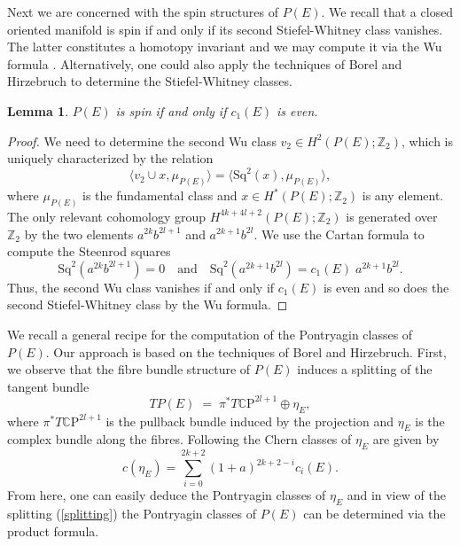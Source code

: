 \documentclass[10pt,a4paper]{amsart}
\theoremstyle{thm}
\newtheorem{lem}[thm]{Lemma}
\theoremstyle{text}
\begin{document}
Next we are concerned with the spin structures of $P(E)$. We recall that a closed oriented manifold is spin if and only if its second Stiefel-Whitney class vanishes. The latter constitutes a homotopy invariant and we may compute it via the Wu formula \cite{MS74}. Alternatively, one could also apply the techniques of Borel and Hirzebruch \cite{BH58} to determine the Stiefel-Whitney classes.

\begin{lem}
$P(E)$ is spin if and only if $c_1(E)$ is even.
\end{lem}

\begin{proof}
We need to determine the second Wu class $v_2 \in H^2(P(E); {\mathbb{Z}}_2)$, which is uniquely characterized by the relation
\[ \langle v_2 \cup x, \mu_{P(E)} \rangle = \langle \mathrm{Sq}^2(x), \mu_{P(E)} \rangle,\]
where $\mu_{P(E)}$ is the fundamental class and $x \in H^{\ast}(P(E); {\mathbb{Z}}_2)$ is any \mbox{element}. The only relevant  cohomology group $H^{4k+4l+2}(P(E); {\mathbb{Z}}_2)$ is generated over ${\mathbb{Z}}_2$ by the two elements $a^{2k}b^{2l+1}$ and $a^{2k+1}b^{2l}$. We use the Cartan formula to compute the Steenrod squares
\[ \mathrm{Sq}^2 (a^{2k}b^{2l+1} ) = 0 \quad \textrm{and} \quad \mathrm{Sq}^2 (a^{2k+1}b^{2l} ) =  c_1(E) \; a^{2k+1}  b^{2l} .\]
Thus, the second Wu class vanishes if and only if $c_1(E)$ is even and so does the second Stiefel-Whitney class by the Wu formula.
\end{proof}

We recall a general recipe for the computation of the Pontryagin classes of $P(E)$. Our approach is based on the techniques of Borel and Hirzebruch. First, we observe that the fibre bundle structure of $P(E)$ induces a splitting of the tangent bundle
\begin{equation} \label{splitting}
 TP(E) \; = \;\pi^{\ast} T {\mathbb{C}\mathrm{P}}^{2l+1} \oplus \eta_E,
\end{equation}
where $\pi^{\ast}T {\mathbb{C}\mathrm{P}}^{2l+1}$ is the pullback bundle induced by the projection and $\eta_E$ is the complex bundle along the fibres. Following \cite[\textit{Section 15.1, p.515}]{BH58} the Chern classes of $\eta_E$  are given by
\[ c(\eta_E) = \sum_{i=0}^{2k+2} (1+a)^{2k+2-i} c_i(E).\]
From here, one can easily deduce the Pontryagin classes of $\eta_E$ and in view of the splitting (\ref{splitting}) the Pontryagin classes of $P(E)$ can be determined via the product formula.
\medskip
\end{document}
